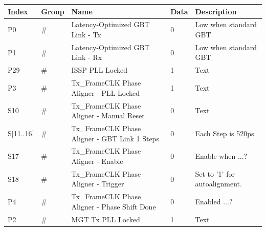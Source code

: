 \documentclass[main.tex]{subfiles}
\begin{document}
\begin{center}
  \begin{tabulary}{1\textwidth}{|L|L|L|L|L|}
  \hline
    Index & Group & Name &  Data & Description   \\
    \hline
     P0   & \# & Latency-Optimized GBT Link - Tx                     & 0 & Low when standard GBT    \\
     \hline
     P1   & \# & Latency-Optimized GBT Link - Rx                    & 0 & Low when standard GBT      \\
     \hline
     P29 & \# & ISSP PLL Locked                                                       & 1 & Text \\
     \hline
     P3   & \# & Tx\_FrameCLK Phase Aligner - PLL Locked & 1 & Text \\     
     \hline
      S10   & \# & Tx\_FrameCLK Phase Aligner - Manual Reset & 0 & Text \\     
     \hline
      S[11..16]   & \# & Tx\_FrameCLK Phase Aligner - GBT Link 1 Steps & 0 & Each Step is 520ps \\     
     \hline
      S17   & \# & Tx\_FrameCLK Phase Aligner - Enable & 0 & Enable when ...? \\    
     \hline
      S18   & \# & Tx\_FrameCLK Phase Aligner - Trigger & 0 & Set to '1' for autoalignment. \\    
     \hline
      P4   & \# & Tx\_FrameCLK Phase Aligner - Phase Shift Done & 0 & Enabled ...? \\    
     \hline
      P2   & \# & MGT Tx PLL Locked & 1 & Text \\    
     \hline     
  \end{tabulary}  
\end{center}
\end{document}
